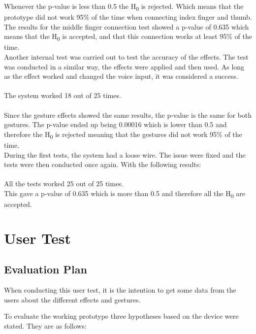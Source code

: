 Whenever the p-value is less than 0.5 the H\textsubscript{0} is rejected. Which means that the prototype did not work 95\% of the time when connecting index finger and thumb. \\

The results for the middle finger connection test showed a p-value of 0.635 which means that the H\textsubscript{0} is accepted, and that this connection works at least 95\% of the time. \\

Another internal test was carried out to test the accuracy of the effects. The test was conducted in a similar way, the effects were applied and then used. 
As long as the effect worked and changed the voice input, it was considered a success. \\\\
The system worked 18 out of 25 times. \\\\

Since the gesture effects showed the same results, the p-value is the same for both gestures. 
The p-value ended up being 0.00016 which is lower than 0.5 and therefore the H\textsubscript{0} is rejected meaning that the gestures did not work 95\% of the time. \\

During the first tests, the system had a loose wire. The issue were fixed and the tests were then conducted once again. With the following results:\\\\
All the tests worked 25 out of 25 times. \\
This gave a p-value of 0.635 which is more than 0.5 and therefore all the H\textsubscript{0} are accepted.  

\section{User Test}


\subsection{Evaluation Plan}
When conducting this user test, it is the intention to get some data from the users about the different effects and gestures. 

To evaluate the working prototype three hypotheses based on the device were stated. They are as follows:

